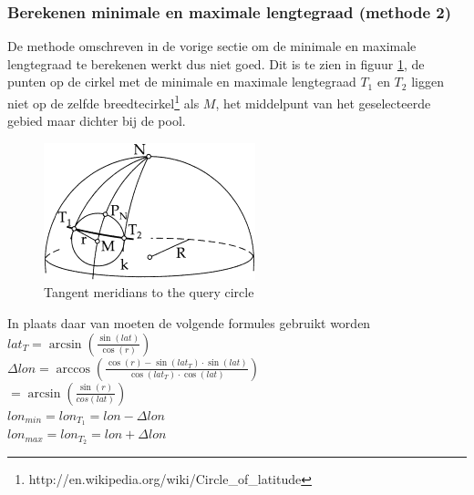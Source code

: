 \documentclass[twoside,openright]{uva-bachelor-thesis}
\begin{document}
		\subsubsection{Berekenen minimale en maximale lengtegraad (methode 2)}
		De methode omschreven in de vorige sectie om de minimale en maximale lengtegraad te berekenen werkt dus niet goed. Dit is te zien in figuur \ref{fig:tangentpoints}, de punten op de cirkel met de minimale en maximale lengtegraad $T_1$ en $T_2$ liggen niet op de zelfde breedtecirkel\footnote{http://en.wikipedia.org/wiki/Circle\_of\_latitude} als $M$, het middelpunt van het geselecteerde gebied maar dichter bij de pool.
		\begin{figure}[!htb]
			\centering
			\includegraphics[scale=1.0]{./img/TangentPoints.png}
			\caption{Tangent meridians to the query circle}
			\label{fig:tangentpoints}
		\end{figure}
		In plaats daar van moeten de volgende formules gebruikt worden
		\\[0.5cm]
		$lat_T = \arcsin(\frac{\sin(lat)}{\cos(r)})$\\
		$\Delta lon = \arccos(\frac{\cos(r) - \sin(lat_T) \cdot \sin(lat)}{\cos(lat_T) \cdot \cos(lat)})$ \\
		$= \arcsin(\frac{\sin(r)}{cos(lat)})$
		\\[0.5cm]
		$lon_{min} = lon_{T_1} = lon - \Delta lon$\\
		$lon_{max} = lon_{T_2} = lon + \Delta lon$
\end{document}
